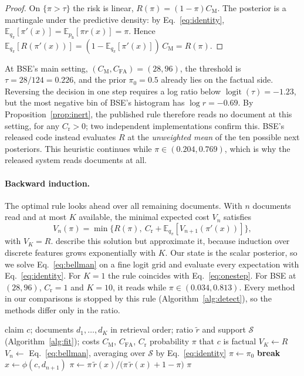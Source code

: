 \documentclass[11pt]{article}
\newcommand{\E}{\mathbb{E}}
\newcommand{\CM}{C_{\mathrm{M}}}
\newcommand{\CFA}{C_{\mathrm{FA}}}
\newcommand{\Cr}{C_{\mathrm{r}}}
\newcommand{\ph}{p_{\mathrm{h}}}
\begin{document}
\begin{proof}
On $\{\pi > \tau\}$ the risk is linear, $R(\pi) = (1 - \pi)\CM$. The
posterior is a martingale under the predictive density: by
Eq.~\ref{eq:identity}, $\E_{q_\pi}[\pi'(x)] = \E_{\ph}[\pi r(x)] = \pi$.
Hence $\E_{q_\pi}[R(\pi'(x))] = (1 - \E_{q_\pi}[\pi'(x)])\,\CM = R(\pi)$.
\end{proof}

At BSE's main setting, $(\CM, \CFA) = (28, 96)$, the threshold is
$\tau = 28/124 = 0.226$, and the prior $\pi_0 = 0.5$ already lies on the
factual side. Reversing the decision in one step requires a log ratio below
$\operatorname{logit}(\tau) = -1.23$, but the most negative bin of BSE's
histogram has $\log r = -0.69$. By Proposition~\ref{prop:inert}, the published
rule therefore reads no document at this setting, for any $\Cr > 0$; two
independent implementations confirm this. BSE's released code instead
evaluates $R$ at the \emph{unweighted mean} of the ten possible next
posteriors. This heuristic continues while $\pi \in (0.204, 0.769)$, which is
why the released system reads documents at all.

\paragraph{Backward induction.} The optimal rule looks ahead over all remaining
documents. With $n$ documents read and at most $K$ available, the minimal
expected cost $V_n$ satisfies
\begin{equation}
V_n(\pi) = \min\bigl\{R(\pi),\ \Cr + \E_{q_{\pi}}[V_{n+1}(\pi'(x))]\bigr\},
\label{eq:bellman}
\end{equation}
with $V_K = R$. \citet{wang-etal-2023-hallucination} describe this solution
but approximate it, because induction over discrete features grows
exponentially with $K$. Our state is the scalar posterior, so we solve
Eq.~\ref{eq:bellman} on a fine logit grid and evaluate every expectation with
Eq.~\ref{eq:identity}. For $K = 1$ the rule coincides with
Eq.~\ref{eq:onestep}. For BSE at $(28, 96)$, $\Cr = 1$ and $K = 10$, it reads
while $\pi \in (0.034, 0.813)$. Every method in our comparisons is stopped by
this rule (Algorithm~\ref{alg:detect}), so the methods differ only in the
ratio.

\begin{algorithm}[t]
\caption{Sequential detection of one claim}
\label{alg:detect}
\small
\begin{algorithmic}[1]
\Require claim $c$; documents $d_1, \dots, d_K$ in retrieval order; ratio $\tilde r$ and support $\mathcal{S}$ (Algorithm~\ref{alg:fit}); costs $\CM$, $\CFA$, $\Cr$
\Ensure probability $\pi$ that $c$ is factual
\State $V_K \gets R$ 
  \State $V_n \gets$ Eq.~\ref{eq:bellman}, averaging over $\mathcal{S}$ by Eq.~\ref{eq:identity}
\EndFor
\State $\pi \gets \pi_0$
   
    \State \textbf{break}
  \EndIf
  \State $x \gets \phi(c, d_{n+1})$ 
  \State $\pi \gets \pi\, \tilde r(x) / \bigl(\pi\, \tilde r(x) + 1 - \pi\bigr)$
\EndFor
\State \Return $\pi$
\end{algorithmic}
\end{algorithm}
\end{document}
